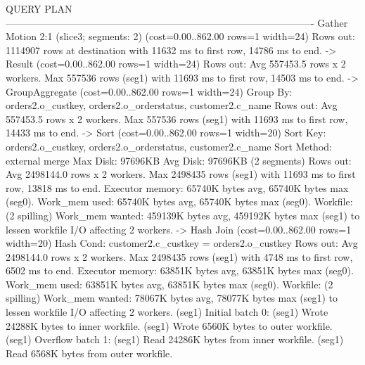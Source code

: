\documentclass[a4paper,11pt]{report}
\begin{document}
\begin{sqlcode}
                                                                            QUERY PLAN                                                                             
----------------------------------------------------------------------------------------------
 Gather Motion 2:1  (slice3; segments: 2)  (cost=0.00..862.00 rows=1 width=24)
   Rows out:  1114907 rows at destination with 11632 ms to first row, 14786 ms to end.
   ->  Result  (cost=0.00..862.00 rows=1 width=24)
         Rows out:  Avg 557453.5 rows x 2 workers.  Max 557536 rows (seg1) with 11693 ms to first row, 14503 ms to end.
         ->  GroupAggregate  (cost=0.00..862.00 rows=1 width=24)
               Group By: orders2.o_custkey, orders2.o_orderstatus, customer2.c_name
               Rows out:  Avg 557453.5 rows x 2 workers.  Max 557536 rows (seg1) with 11693 ms to first row, 14433 ms to end.
               ->  Sort  (cost=0.00..862.00 rows=1 width=20)
                     Sort Key: orders2.o_custkey, orders2.o_orderstatus, customer2.c_name
                     Sort Method:  external merge  Max Disk: 97696KB  Avg Disk: 97696KB (2 segments)
                     Rows out:  Avg 2498144.0 rows x 2 workers.  Max 2498435 rows (seg1) with 11693 ms to first row, 13818 ms to end.
                     Executor memory:  65740K bytes avg, 65740K bytes max (seg0).
                     Work_mem used:  65740K bytes avg, 65740K bytes max (seg0). Workfile: (2 spilling)
                     Work_mem wanted: 459139K bytes avg, 459192K bytes max (seg1) to lessen workfile I/O affecting 2 workers.
                     ->  Hash Join  (cost=0.00..862.00 rows=1 width=20)
                           Hash Cond: customer2.c_custkey = orders2.o_custkey
                           Rows out:  Avg 2498144.0 rows x 2 workers.  Max 2498435 rows (seg1) with 4748 ms to first row, 6502 ms to end.
                           Executor memory:  63851K bytes avg, 63851K bytes max (seg0).
                           Work_mem used:  63851K bytes avg, 63851K bytes max (seg0). Workfile: (2 spilling)
                           Work_mem wanted: 78067K bytes avg, 78077K bytes max (seg1) to lessen workfile I/O affecting 2 workers.
                           (seg1)   Initial batch 0:
                           (seg1)     Wrote 24288K bytes to inner workfile.
                           (seg1)     Wrote 6560K bytes to outer workfile.
                           (seg1)   Overflow batch 1:
                           (seg1)     Read 24286K bytes from inner workfile.
                           (seg1)     Read 6568K bytes from outer workfile.

\end{sqlcode}
\end{document}
